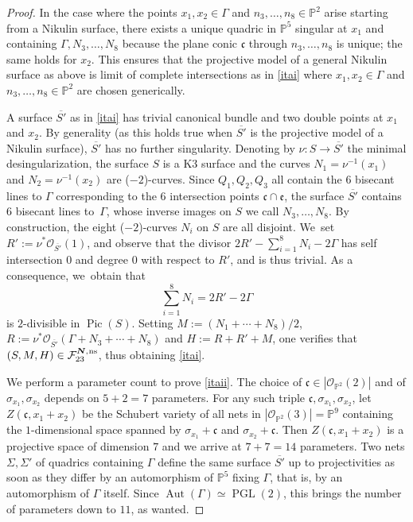 \documentclass[11pt]{article}
\newcommand{\ns}{{\mkern1mu\mathrm{ns}}}
\newcommand{\bN}{\boldsymbol{N}}
\theoremstyle{plain}
\theoremstyle{definition}
\DeclareMathOperator{\Aut}{Aut}
\DeclareMathOperator{\PGL}{PGL}
\DeclareMathOperator{\Pic}{Pic}
\newcommand\PP{{\mathbb P}}
\newcommand\F{{\mathcal F}}
\begin{document}
\begin{proof}
In the case where the points $x_1,x_2\in \Gamma$ and $n_3,\ldots,n_8 \in \PP^2$ arise starting from a Nikulin surface, there exists a unique quadric in $\PP^5$ singular at $x_1$ and containing $\Gamma, N_3,\ldots,N_8$ because the plane conic $\mathfrak{c}$ through $n_3,\ldots,n_8$ is unique; the same holds for $x_2$. This ensures that the projective model of a general Nikulin surface as above is limit of complete intersections as in \eqref{itai} where $x_1,x_2\in \Gamma$ and $n_3,\ldots,n_8 \in \PP^2$ are chosen generically.

A surface $\overline{S'}$ as in \eqref{itai} has trivial canonical bundle and two double points at $x_1$ and $x_2$. By generality (as this holds true when $\overline{S'}$ is the projective model of a Nikulin surface), $\overline{S'}$ has no further singularity. Denoting by $\nu:S\to \overline{S'}$ the minimal desingularization, the surface $S$ is a K3 surface and the curves $N_1=\nu^{-1}(x_1)$ and $N_2=\nu^{-1}(x_2)$ are ($-2$)-curves. Since $Q_1,Q_2,Q_3$ all contain the $6$ bisecant lines to $\Gamma$ corresponding to the $6$ intersection points $\mathfrak{c}\cap \mathfrak{e}$, the surface $\overline{S'}$ contains $6$ bisecant lines to~$\Gamma$, whose \hbox{inverse} images on $S$ we call $N_3,\ldots,N_8$. By construction, the eight ($-2$)\nobreakdash-curves $N_i$ on $S$ are all disjoint. We~set $R':=\nu^*\mathcal{O}_{\overline{S'}}(1)$, and observe that the divisor
$2R'-\sum_{i=1}^8N_i-2\Gamma$
has self intersection $0$ and degree $0$ with respect to $R'$, and is thus trivial. As a consequence, we~obtain that
\[
\sum_{i=1}^8N_i=2R'-2\Gamma
\]
is $2$-divisible in $\Pic(S)$. Setting $M:=(N_1+\cdots + N_8)/2$, $R:=\nu^*\mathcal{O}_{\overline{S'}}(\Gamma+N_3+\cdots+N_8)$ and $H:=R+R'+M$, one verifies that $(S,M,H)\in \F_{23}^{\bN,\ns}$, thus obtaining \eqref{itai}.

We perform a parameter count to prove \eqref{itaii}. The choice of $\mathfrak{c}\!\in\! |\mathcal O_{\PP^2}(2)|$ and of $\sigma_{x_1},\sigma_{x_2}$ depends on $5+2\!=\!7$ parameters. For any such triple $\mathfrak{c}, \sigma_{x_1},\sigma_{x_2}$, let \hbox{$Z(\mathfrak{c}, x_1\!+\!x_2)$} be the Schubert variety of all nets in $|\mathcal O_{\PP^2}(3)|=\PP^9$ containing the $1$-dimensional space spanned by $\sigma_{x_1}+\mathfrak{c}$ and $\sigma_{x_2}+\mathfrak{c}$. Then $Z(\mathfrak{c}, x_1+x_2)$ is a projective space of dimension $7$ and we arrive at $7+7=14$ parameters. Two nets $\Sigma,\Sigma'$ of quadrics containing $\Gamma$ define the same surface $\overline{S'}$ up to projectivities as soon as they differ by an automorphism of $\PP^5$ fixing $\Gamma$, that is, by an automorphism of $\Gamma$ itself. Since $\Aut(\Gamma)\simeq \PGL(2)$, this brings the number of parameters down to $11$, as wanted.
\end{proof}
\end{document}
